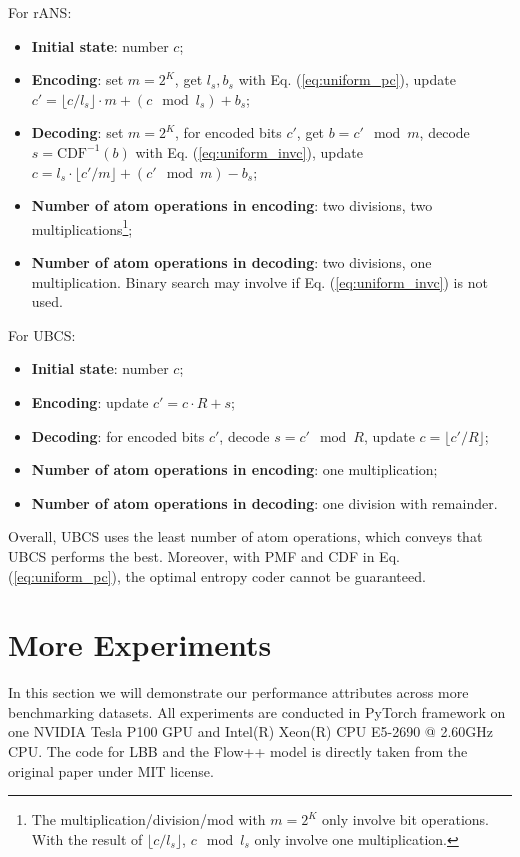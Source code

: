 \documentclass{article}
\begin{document}
For rANS:
\begin{itemize}
    \item {\bf Initial state}: number $c$;
    \item {\bf Encoding}: set $m = 2^K$, get $l_s, b_s$ with Eq. (\ref{eq:uniform_pc}), update $c' = \lfloor c / l_s \rfloor \cdot m + (c \mod l_s) + b_s$; 
    \item {\bf Decoding}: set $m = 2^K$, for encoded bits $c'$, get $b = c' \mod m$, decode $s = \mathrm{CDF}^{-1} (b)$ with Eq. (\ref{eq:uniform_invc}), update $c = l_s \cdot \lfloor c' / m \rfloor + (c' \mod m) - b_s$;
    \item {\bf Number of atom operations in encoding}: two divisions, two multiplications\footnote{The multiplication/division/mod with $m = 2^K$ only involve bit operations. With the result of $\lfloor c / l_s \rfloor$, $c \mod l_s$ only involve one multiplication.};
    \item {\bf Number of atom operations in decoding}: two divisions, one multiplication. Binary search may involve if Eq. (\ref{eq:uniform_invc}) is not used. 
\end{itemize}

For UBCS:
\begin{itemize}
    \item {\bf Initial state}: number $c$;
    \item {\bf Encoding}: update $c' = c \cdot R + s$; 
    \item {\bf Decoding}: for encoded bits $c'$, decode $s = c' \mod R$, update $c = \lfloor c' / R \rfloor$;
    \item {\bf Number of atom operations in encoding}: one multiplication;
    \item {\bf Number of atom operations in decoding}: one division with remainder. 
\end{itemize}

Overall, UBCS uses the least number of atom operations, which conveys that UBCS performs the best. Moreover, with PMF and CDF in Eq. (\ref{eq:uniform_pc}), the optimal entropy coder cannot be guaranteed. 

\section{More Experiments}

In this section we will demonstrate our performance attributes across more benchmarking datasets. All experiments are conducted in PyTorch framework on one NVIDIA Tesla P100 GPU and Intel(R) Xeon(R) CPU E5-2690 @ 2.60GHz CPU. The code for LBB and the Flow++ model is directly taken from the original paper under MIT license. 
\end{document}
